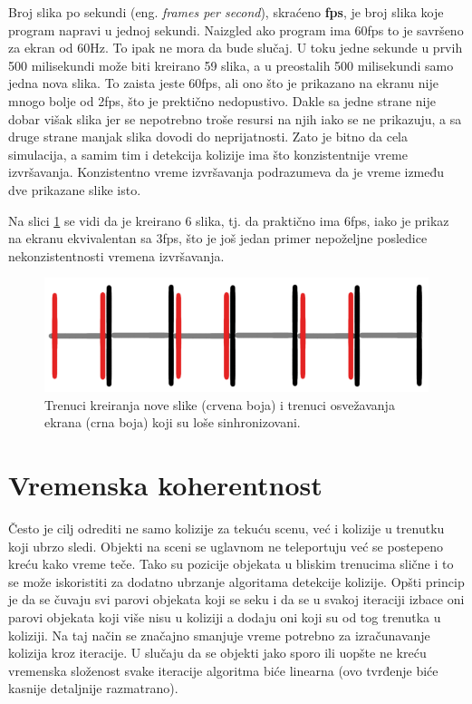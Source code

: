 \documentclass[12pt,oneside]{memoir}
\begin{document}
Broj slika po sekundi (eng. {\em frames per second}), skraćeno \textbf{fps}, je broj slika koje program napravi u jednoj sekundi.
Naizgled ako program ima 60fps to je savršeno za ekran od 60Hz. To ipak ne mora da bude slučaj.
U toku jedne sekunde u prvih 500 milisekundi može biti kreirano 59 slika, a u preostalih 500 milisekundi samo jedna nova slika. 
To zaista jeste 60fps, ali ono što je prikazano na ekranu nije mnogo bolje od 2fps, 
što je prektično nedopustivo. 
Dakle sa jedne strane nije dobar višak slika jer se nepotrebno troše resursi na njih iako se ne prikazuju, 
a sa druge strane manjak slika dovodi do neprijatnosti.
Zato je bitno da cela simulacija, a samim tim i detekcija kolizije ima što konzistentnije vreme izvršavanja.
Konzistentno vreme izvršavanja podrazumeva da je vreme između dve prikazane slike isto.

Na slici \ref{fig:fpsdiv2} se vidi da je kreirano 6 slika, tj. da praktično ima 6fps, iako je prikaz na ekranu 
ekvivalentan sa 3fps, što je još jedan primer nepoželjne posledice nekonzistentnosti vremena izvršavanja. 

\begin{figure}[h!]
	\begin{center}
	\includegraphics[scale=0.5]{fpsdiv2.png}
	\end{center}
	\caption{ Trenuci kreiranja nove slike (crvena boja) i trenuci osvežavanja ekrana (crna boja) koji su loše sinhronizovani. }
	\label{fig:fpsdiv2}
\end{figure}

\section{Vremenska koherentnost}

Često je cilj odrediti ne samo kolizije za tekuću scenu, već i kolizije u trenutku koji ubrzo sledi.
Objekti na sceni se uglavnom ne teleportuju već se postepeno kreću kako vreme teče.
Tako su pozicije objekata u bliskim trenucima slične i to se može iskoristiti za dodatno ubrzanje algoritama detekcije kolizije. 
Opšti princip je da se čuvaju svi parovi objekata koji se seku i da se u svakoj iteraciji 
izbace oni parovi objekata koji više nisu u koliziji a dodaju oni koji su od tog trenutka u koliziji.
Na taj način se značajno smanjuje vreme potrebno za izračunavanje kolizija kroz iteracije.
U slučaju da se objekti jako sporo ili uopšte ne kreću 
vremenska složenost svake iteracije algoritma biće linearna (ovo tvrđenje biće kasnije detaljnije razmatrano).
\end{document}
